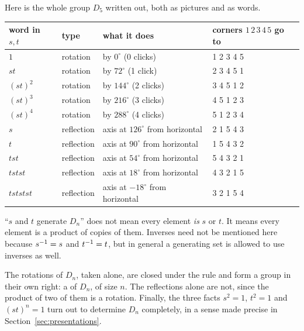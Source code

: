 Here is the whole group $D_5$ written out, both as pictures and as words.


\begin{center}
\small
\begin{tabular}{@{}llll@{}}
\toprule
word in $s,t$ & type & what it does & corners $1\,2\,3\,4\,5$ go to\\
\midrule
$1$ & rotation & by $0^\circ$ (0 clicks) & 1 2 3 4 5\\
$st$ & rotation & by $72^\circ$ (1 click) & 2 3 4 5 1\\
$(st)^2$ & rotation & by $144^\circ$ (2 clicks) & 3 4 5 1 2\\
$(st)^3$ & rotation & by $216^\circ$ (3 clicks) & 4 5 1 2 3\\
$(st)^4$ & rotation & by $288^\circ$ (4 clicks) & 5 1 2 3 4\\
\midrule
$s$ & reflection & axis at $126^\circ$ from horizontal & 2 1 5 4 3\\
$t$ & reflection & axis at $90^\circ$ from horizontal & 1 5 4 3 2\\
$tst$ & reflection & axis at $54^\circ$ from horizontal & 5 4 3 2 1\\
$tstst$ & reflection & axis at $18^\circ$ from horizontal & 4 3 2 1 5\\
$tststst$ & reflection & axis at $-18^\circ$ from horizontal & 3 2 1 5 4\\
\bottomrule
\end{tabular}
\end{center}

\begin{pitfall}
``$s$ and $t$ generate $D_n$'' does not mean every element \emph{is} $s$ or $t$. It means every
element is a product of copies of them. Inverses need not be mentioned here because $s^{-1}=s$ and
$t^{-1}=t$, but in general a generating set is allowed to use inverses as well.
\end{pitfall}

The rotations of $D_n$, taken alone, are closed under the rule and form a group in their own right:
a  of $D_n$, of size $n$. The reflections alone are not, since the product of two of
them is a rotation. Finally, the three facts $s^2=1$, $t^2=1$ and $(st)^n=1$ turn out to determine
$D_n$ completely, in a sense made precise in Section~\ref{sec:presentations}.

